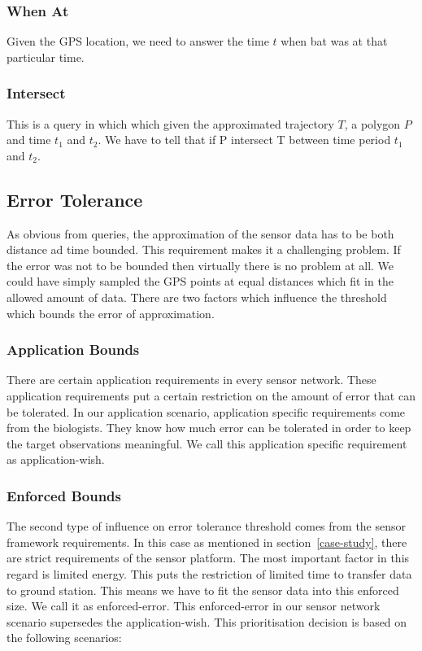 \documentclass[conference]{IEEEtran}
\begin{document}
\subsubsection{When At}
Given the GPS location, we need to answer the time $t$ when bat was at that particular time. 
\subsubsection{Intersect}
This is a query in which which given the approximated trajectory $T$, a polygon $P$ and time $t_1$ and $t_2$. We have to tell that if P intersect T between time period $t_1$ and $t_2$.
\subsection{Error Tolerance}
As obvious from queries, the approximation of the sensor data has to be both distance ad time bounded. 
This requirement makes it a challenging problem. If the error was not to be bounded then virtually there is no problem at all. We could have simply sampled the GPS points at equal distances which fit in the allowed amount of data. There are two factors which influence the threshold which bounds the error of approximation.\

\subsubsection{Application Bounds}There are certain application requirements in every sensor network. These application requirements put a certain restriction on the amount of error that can be tolerated. In our application scenario, application specific requirements come from the biologists. They know how much error can be tolerated in order to keep the target observations meaningful. We call this application specific requirement as application-wish.

\subsubsection{Enforced Bounds}The second type of influence on error tolerance threshold comes from the sensor framework requirements. In this case as mentioned in section~\ref{case-study}, there are strict requirements of the sensor platform. The most important factor in this regard is limited energy. This puts the restriction of limited time to transfer data to ground station. This means we have to fit the sensor data into this enforced size. We call it as enforced-error. This enforced-error in our sensor network scenario supersedes the application-wish. This prioritisation decision is based on the following scenarios:
\end{document}
